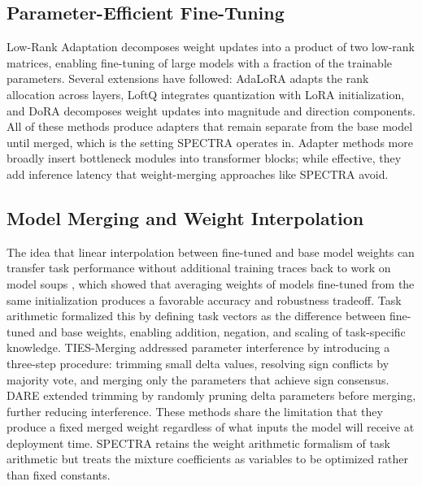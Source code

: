 \documentclass[preprint,12pt]{elsarticle}
\begin{document}
\subsection{Parameter-Efficient Fine-Tuning}

Low-Rank Adaptation \cite{hu2022lora} decomposes weight updates into a product
of two low-rank matrices, enabling fine-tuning of large models with a fraction
of the trainable parameters. Several extensions have followed: AdaLoRA
\cite{zhang2023adalora} adapts the rank allocation across layers, LoftQ
\cite{liu2024loftq} integrates quantization with LoRA initialization, and
DoRA \cite{liu2024dora} decomposes weight updates into magnitude and direction
components. All of these methods produce adapters that remain separate from
the base model until merged, which is the setting SPECTRA operates in.
Adapter methods more broadly \cite{houlsby2019parameter} insert bottleneck
modules into transformer blocks; while effective, they add inference latency
that weight-merging approaches like SPECTRA avoid.

\subsection{Model Merging and Weight Interpolation}

The idea that linear interpolation between fine-tuned and base model weights
can transfer task performance without additional training traces back to work
on model soups \cite{wortsman2022model}, which showed that averaging weights of
models fine-tuned from the same initialization produces a favorable accuracy
and robustness tradeoff. Task arithmetic \cite{ilharco2023editing} formalized
this by defining task vectors as the difference between fine-tuned and base
weights, enabling addition, negation, and scaling of task-specific knowledge.
TIES-Merging \cite{yadav2023tiesmerging} addressed parameter interference by
introducing a three-step procedure: trimming small delta values, resolving sign
conflicts by majority vote, and merging only the parameters that achieve
sign consensus. DARE \cite{yu2024language} extended trimming by randomly
pruning delta parameters before merging, further reducing interference.
These methods share the limitation that they produce a fixed merged weight
regardless of what inputs the model will receive at deployment time. SPECTRA
retains the weight arithmetic formalism of task arithmetic but treats the
mixture coefficients as variables to be optimized rather than fixed constants.
\end{document}
